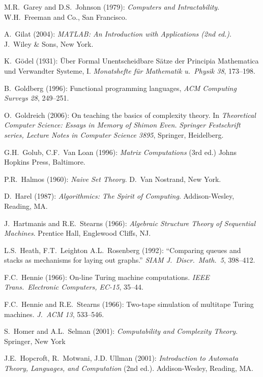\begin{thebibliography}{999}
M.R.~Garey and D.S.~Johnson (1979):
{\it Computers and Intractability}.
W.H.~Freeman and Co., San Francisco.

A.~Gilat (2004):
{\it MATLAB: An Introduction with Applications (2nd ed.)}.
J.~Wiley \& Sons, New York.

K.~G\"{o}del (1931): \"{U}ber Formal Unentscheidbare S\"{a}tze der
Principia Mathematica und Verwandter Systeme, I.  {\it Monatshefte
f\"{u}r Mathematik u.~Physik 38}, 173--198.

B.~Goldberg (1996): Functional programming languages,  {\it ACM
  Computing Surveys 28}, 249--251.

O.~Goldreich (2006): On teaching the basics of complexity theory.  In
{\it Theoretical Computer Science: Essays in Memory of Shimon Even.}
{\it Springer Festschrift series, Lecture Notes in Computer Science
3895}, Springer, Heidelberg.

G.H.~Golub, C.F.~Van Loan (1996):
{\it Matrix Computations} (3rd ed.)
Johns Hopkins Press,  Baltimore.


P.R.~Halmos (1960):
{\it Naive Set Theory}.
D.~Van Nostrand, New York.

D.~Harel (1987): {\it Algorithmics: The Spirit of Computing}.
Addison-Wesley, Reading, MA.

J.~Hartmanis and R.E.~Stearns (1966): {\it Algebraic Structure Theory
of Sequential Machines}.  Prentice Hall, Englewood Cliffs, NJ.

L.S.~Heath, F.T.~Leighton A.L.~Rosenberg (1992): ``Comparing queues
and stacks as mechanisms for laying out graphs.''  {\it SIAM
  J.~Discr.~Math.~5}, 398--412.

F.C.~Hennie (1966): On-line Turing machine computations.  {\it IEEE
Trans.~Electronic Computers, EC-15}, 35--44.

F.C.~Hennie and R.E.~Stearns (1966): Two-tape simulation of multitape
Turing machines. {\it J.~ACM 13}, 533--546.

S.~Homer and A.L.~Selman (2001):
{\it Computability and Complexity Theory}.
Springer, New York

J.E.~Hopcroft, R.~Motwani, J.D. Ullman (2001):
{\it Introduction to Automata Theory, Languages, and Computation} (2nd
ed.).
Addison-Wesley, Reading, MA.


\end{thebibliography}
